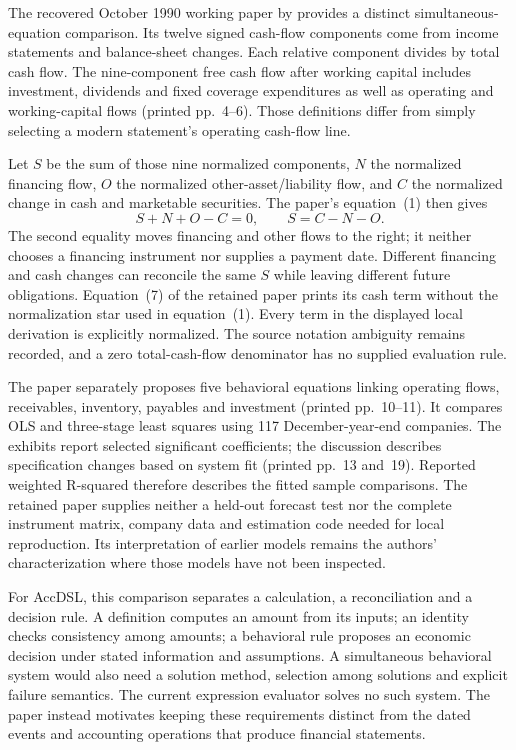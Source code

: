 The recovered October 1990 working paper by \citet{gentryhoque1990wp}
provides a distinct simultaneous-equation comparison. Its twelve signed
cash-flow components come from income statements and balance-sheet changes.
Each relative component divides by total cash flow. The nine-component
free cash flow after working capital includes investment, dividends and
fixed coverage expenditures as well as operating and working-capital flows
(printed pp.~4--6). Those definitions differ from simply selecting a modern
statement's operating cash-flow line.

Let \(S\) be the sum of those nine normalized components, \(N\) the
normalized financing flow, \(O\) the normalized other-asset/liability flow,
and \(C\) the normalized change in cash and marketable securities. The
paper's equation~(1) then gives
\[
S+N+O-C=0,\qquad S=C-N-O.
\]
The second equality moves financing and other flows to the right; it neither
chooses a financing instrument nor supplies a payment date. Different
financing and cash changes can reconcile the same \(S\) while leaving
different future obligations. Equation~(7) of the retained paper prints its
cash term without the normalization star used in equation~(1). Every term
in the displayed local derivation is explicitly normalized. The source
notation ambiguity remains recorded, and a zero total-cash-flow denominator
has no supplied evaluation rule.

The paper separately proposes five behavioral equations linking operating
flows, receivables, inventory, payables and investment (printed pp.~10--11).
It compares OLS and three-stage least squares using 117 December-year-end
companies. The exhibits report selected significant coefficients; the
discussion describes specification changes based on system fit (printed
pp.~13 and~19). Reported weighted R-squared therefore describes the fitted
sample comparisons. The retained paper supplies neither a held-out forecast
test nor the complete instrument matrix, company data and estimation code
needed for local reproduction. Its interpretation of earlier models remains
the authors' characterization where those models have not been inspected.

For AccDSL, this comparison separates a calculation, a reconciliation and a
decision rule. A definition computes an amount from its inputs; an identity
checks consistency among amounts; a behavioral rule proposes an economic
decision under stated information and assumptions. A simultaneous behavioral
system would also need a solution method, selection among solutions and
explicit failure semantics. The current expression evaluator solves no such
system. The paper instead motivates keeping these requirements distinct from
the dated events and accounting operations that produce financial statements.

